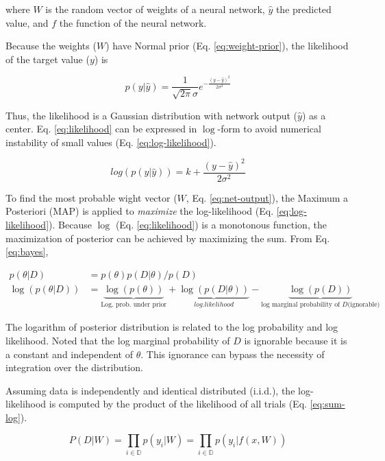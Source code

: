 \documentclass{article}
\begin{document}
where $W$ is the random vector of weights of a neural network, $\hat{y}$ the predicted value, and $f$ the function of the neural network.

Because the weights ($W$) have Normal prior (Eq. \ref{eq:weight-prior}),  the likelihood of the target value ($y$) is 

\begin{equation}
    p(y|\hat{y}) = \frac{1}{\sqrt{2\pi}\sigma}e^{-\frac{(y-\hat{y})^2}{2\sigma^2}}
    \label{eq:likelihood}
\end{equation}

Thus, the likelihood is a Gaussian distribution with network output ($\hat{y}$) as a center. Eq. \ref{eq:likelihood} can be expressed in $\log$-form to avoid numerical instability of small values (Eq. \ref{eq:log-likelihood}).

\begin{equation}
    log (p(y|\hat{y})) = k + \frac{(y-\hat{y})^2}{2\sigma^2}
    \label{eq:log-likelihood}
\end{equation}


To find the most probable wight vector ($W$, Eq. \ref{eq:net-output}), the Maximum a Posteriori (MAP) is applied to \textit{maximize} the log-likelihood (Eq. \ref{eq:log-likelihood}). Because $\log$ (Eq. \ref{eq:likelihood}) is a monotonous function, the maximization of posterior can be achieved by maximizing the sum. From Eq. \ref{eq:bayes}, 

\begin{align}
    p(\theta|D) &= p(\theta) p(D|\theta) / p(D)\\
    \log(p(\theta|D)) &= \underbrace{\log(p(\theta))}_{\text{Log. prob. under prior}} + \underbrace{\log(p(D|\theta))}_{log. likelihood} - \underbrace{\log(p(D))}_{\text{log marginal probability of } D \text{(ignorable)}}\label{eq:log-sums}
\end{align}

The logarithm of posterior distribution is related to the log probability and log likelihood. Noted that the log marginal probability of $D$ is ignorable because it is a constant and independent of $\theta$. This ignorance can bypass the necessity of integration over the distribution.


Assuming data is independently and identical distributed (i.i.d.), the log-likelihood is computed by the product of the likelihood of all trials (Eq. \ref{eq:sum-log}).

\begin{equation}
    P(D|W) = \prod_{i\in \mathbb{D}} p(y_i | W) = \prod_{i \in \mathbb{D}} p(y_i | f(x, W))
\label{eq:sum-log}
\end{equation}
\end{document}
